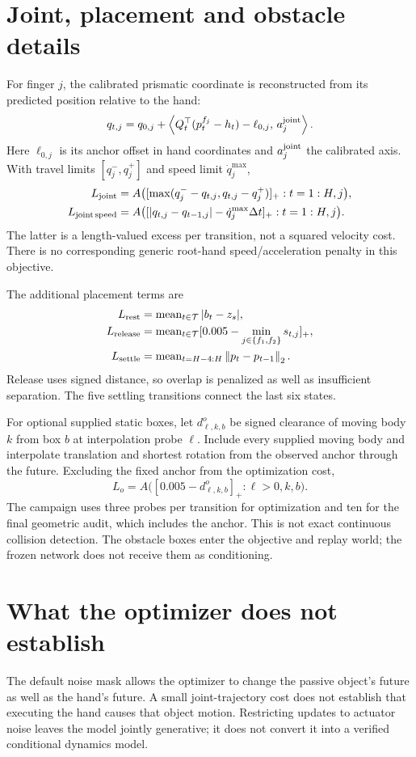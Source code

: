 \documentclass[10pt]{article}
\newcommand{\norm}[1]{\left\lVert#1\right\rVert}
\newcommand{\mean}{\operatorname{mean}}
\begin{document}
\section{Joint, placement and obstacle details}
For finger $j$, the calibrated prismatic coordinate is reconstructed from its
predicted position relative to the hand:
\[
 q_{t,j}=q_{0,j}+\left\langle
 Q_t^\top(p^{f_j}_t-h_t)-\ell_{0,j},\,a_j^{\rm joint}\right\rangle.
\]
Here $\ell_{0,j}$ is its anchor offset in hand coordinates and $a_j^{\rm joint}$
the calibrated axis. With travel limits $[q_j^-,q_j^+]$ and speed limit
$\dot q_j^{\max}$,
\begin{align}
 L_{\rm joint}&=A\bigl([\max(q_j^- -q_{t,j},q_{t,j}-q_j^+)]_+:t=1:H,j\bigr),\\
 L_{\rm joint\,speed}&=A\bigl([|q_{t,j}-q_{t-1,j}|-\dot q_j^{\max}\Delta t]_+
                                      :t=1:H,j\bigr).
\end{align}
The latter is a length-valued excess per transition, not a squared velocity
cost. There is no corresponding generic root-hand speed/acceleration penalty
in this objective.

The additional placement terms are
\begin{align}
 L_{\rm rest}&=\mean_{t\in\mathcal T}|b_t-z_s|,\\
 L_{\rm release}&=\mean_{t\in\mathcal T}
                       [0.005-\min_{j\in\{f_1,f_2\}}s_{t,j}]_+,\\
 L_{\rm settle}&=\mean_{t=H-4:H}\norm{p_t-p_{t-1}}_2.
\end{align}
Release uses signed distance, so overlap is penalized as well as insufficient
separation. The five settling transitions connect the last six states.

For optional supplied static boxes, let $d^{o}_{\ell,k,b}$ be signed clearance
of moving body $k$ from box $b$ at interpolation probe $\ell$. Include every
supplied moving body and interpolate translation and shortest rotation from
the observed anchor through the future. Excluding the fixed anchor from the
optimization cost,
\[
 L_o=A\bigl([0.005-d^{o}_{\ell,k,b}]_+:\ell>0,k,b\bigr).
\]
The campaign uses three probes per transition for optimization and ten for
the final geometric audit, which includes the anchor. This is not exact
continuous collision detection. The obstacle boxes enter the objective and
replay world; the frozen network does not receive them as conditioning.

\section{What the optimizer does not establish}
The default noise mask allows the optimizer to change the passive object's
future as well as the hand's future. A small joint-trajectory cost does not
establish that executing the hand causes that object motion. Restricting
updates to actuator noise leaves the model jointly generative; it does not
convert it into a verified conditional dynamics model.
\end{document}
